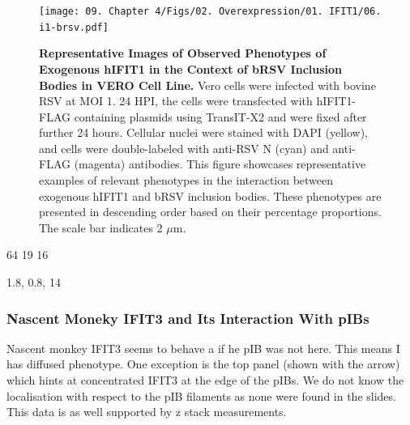 \begin{figure}
    \centering
    \texttt{[image: 09. Chapter 4/Figs/02. Overexpression/01. IFIT1/06. i1-brsv.pdf]}
    \caption[Representative Images of Observed Phenotypes of Exogenous hIFIT1 in the Context of bRSV Inclusion Bodies in VERO Cell Line.]{\textbf{Representative Images of Observed Phenotypes of Exogenous hIFIT1 in the Context of bRSV Inclusion Bodies in VERO Cell Line.} Vero cells were infected with bovine RSV at MOI 1. 24 HPI, the cells were transfected with hIFIT1-FLAG containing plasmids using TransIT-X2 and were fixed after further 24 hours. Cellular nuclei were stained with DAPI (yellow), and cells were double-labeled with anti-RSV N (cyan) and anti-FLAG (magenta) antibodies. This figure showcases representative examples of relevant phenotypes in the interaction between exogenous hIFIT1 and bRSV inclusion bodies. These phenotypes are presented in descending order based on their percentage proportions. The scale bar indicates 2 \(\mu \mbox{m}\).}
    \label{fig:Representative Images of Observed Phenotypes of Exogenous hIFIT1 in the Context of bRSV Inclusion Bodies in VERO Cell Line}
\end{figure}

64 19 16

1.8, 0.8, 14

\subsubsection{Nascent Moneky IFIT3 and Its Interaction With pIBs}
Nascent monkey IFIT3 seems to behave a if he pIB was not here. This means I has diffused phenotype. One exception is the top panel (shown with the arrow) which hints at concentrated IFIT3 at the edge of the pIBs. We do not know the localisation with respect to the pIB filaments as none were found in the slides. This data is as well supported by z stack measurements.

